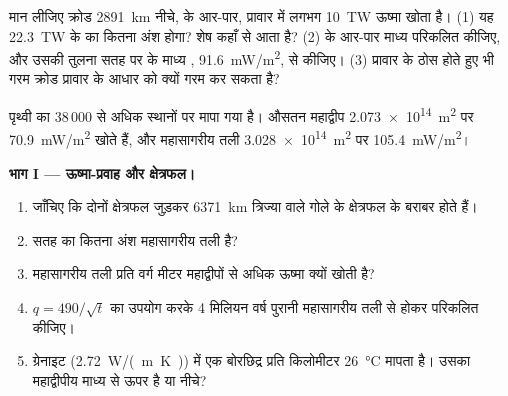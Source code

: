 \begin{exercise}[$\star\star\star$]\label{exo:g12:internal-heat:15}
मान लीजिए क्रोड \qty{2891}{km} नीचे,  के आर-पार, प्रावार में
लगभग \qty{10}{TW} ऊष्मा खोता है। (1) यह \qty{22.3}{TW} के
 का कितना अंश होगा? शेष कहाँ से
आता है? (2)  के आर-पार माध्य  परिकलित कीजिए,
और उसकी तुलना सतह पर के माध्य ,
\qty{91.6}{mW/m^2}, से कीजिए। (3) प्रावार के ठोस होते हुए भी गरम क्रोड
प्रावार के आधार को क्यों गरम कर सकता है?
\end{exercise}

\begin{problem}
\label{pb:g12:internal-heat:1}
पृथ्वी का  38\,000 से अधिक स्थानों पर मापा गया है।
औसतन महाद्वीप \qty{2.073e14}{m^2} पर \qty{70.9}{mW/m^2} खोते हैं,
और महासागरीय तली \qty{3.028e14}{m^2} पर \qty{105.4}{mW/m^2}।

\medskip
\noindent\textbf{भाग I --- ऊष्मा-प्रवाह और क्षेत्रफल।}
\begin{enumerate}
  \item जाँचिए कि दोनों क्षेत्रफल जुड़कर \qty{6371}{km} त्रिज्या वाले गोले के
        क्षेत्रफल के बराबर होते हैं।
  \item सतह का कितना अंश महासागरीय तली है?
  \item महासागरीय तली प्रति वर्ग मीटर महाद्वीपों से अधिक ऊष्मा
        क्यों खोती है?
  \item $q = 490/\sqrt{t}$ का उपयोग करके 4 मिलियन वर्ष पुरानी
        महासागरीय तली से होकर  परिकलित कीजिए।
  \item ग्रेनाइट (\qty{2.72}{W/(m.K)}) में एक बोरछिद्र प्रति किलोमीटर
        \qty{26}{\celsius} मापता है। उसका  महाद्वीपीय माध्य से
        ऊपर है या नीचे?
\end{enumerate}


\end{problem}
